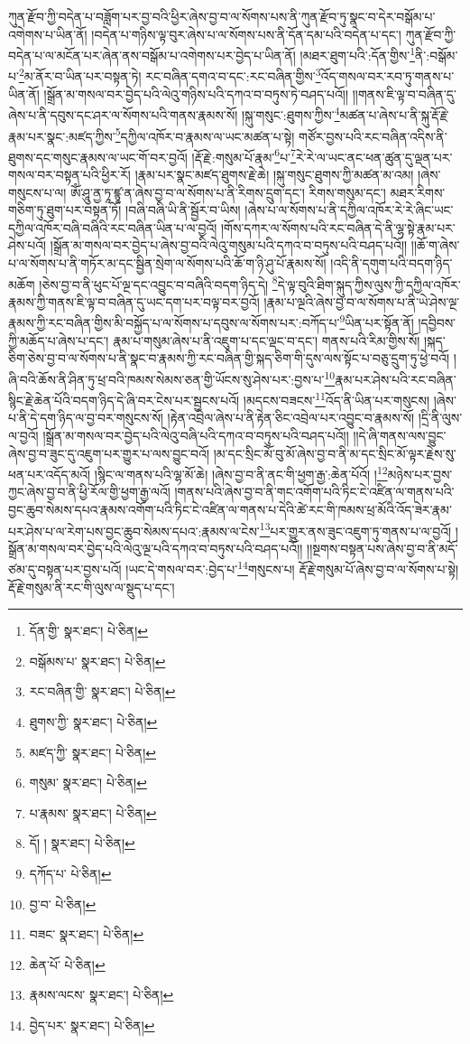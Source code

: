 ཀུན་རྫོབ་ཀྱི་བདེན་པ་བཟློག་པར་བྱ་བའི་ཕྱིར་ཞེས་བྱ་བ་ལ་སོགས་པས་ནི་ཀུན་རྫོབ་ཏུ་སྣང་བ་དེར་བསྒོམ་པ་འགེགས་པ་ཡིན་ནོ། །བདེན་པ་གཉིས་ལྟ་བུར་ཞེས་པ་ལ་སོགས་པས་ནི་དོན་དམ་པའི་བདེན་པ་དང་། ཀུན་རྫོབ་ཀྱི་བདེན་པ་ལ་མངོན་པར་ཞེན་ནས་བསྒོམ་པ་འགེགས་པར་བྱེད་པ་ཡིན་ནོ། །མཐར་ཐུག་པའི་:དོན་གྱིས་\footnote{དོན་གྱི་  སྣར་ཐང་།  པེ་ཅིན། }ནི་:བསྒོམ་པ་\footnote{བསྒོམས་པ་  སྣར་ཐང་།  པེ་ཅིན། }མ་ནོར་བ་ཡིན་པར་བསྟན་ཏེ། རང་བཞིན་དགའ་བ་དང་:རང་བཞིན་གྱིས་\footnote{རང་བཞིན་གྱི་  སྣར་ཐང་།  པེ་ཅིན། }འོད་གསལ་བར་རབ་ཏུ་གནས་པ་ཡིན་ནོ། །སྒྲོན་མ་གསལ་བར་བྱེད་པའི་ལེའུ་གཉིས་པའི་དཀའ་བ་བཏུས་ཏེ་བཤད་པའོ།། །།གནས་ཇི་ལྟ་བ་བཞིན་དུ་ཞེས་པ་ནི་དབུས་དང་ཤར་ལ་སོགས་པའི་གནས་རྣམས་སོ། །སྐུ་གསུང་:ཐུགས་ཀྱིས་\footnote{ཐུགས་ཀྱི་  སྣར་ཐང་།  པེ་ཅིན། }མཚན་པ་ཞེས་པ་ནི་སྐུ་རྡོ་རྗེ་རྣམ་པར་སྣང་:མཛད་ཀྱིས་\footnote{མཛད་ཀྱི་  སྣར་ཐང་།  པེ་ཅིན། }དཀྱིལ་འཁོར་བ་རྣམས་ལ་ཡང་མཚན་པ་སྟེ། གཙོར་བྱས་པའི་རང་བཞིན་འདིས་ནི་ཐུགས་དང་གསུང་རྣམས་ལ་ཡང་གོ་བར་བྱའོ། །རྡོ་རྗེ་:གསུམ་པོ་རྣམ་\footnote{གསུམ་  སྣར་ཐང་།  པེ་ཅིན། }པ་\footnote{པ་རྣམས་  སྣར་ཐང་།  པེ་ཅིན། }རེ་རེ་ལ་ཡང་ནང་ཕན་ཚུན་དུ་ལྡན་པར་གསལ་བར་བསྟན་པའི་ཕྱིར་རོ། །རྣམ་པར་སྣང་མཛད་ཐུགས་རྗེ་ཆེ། །སྐུ་གསུང་ཐུགས་ཀྱི་མཚན་མ་འམ། །ཞེས་གསུངས་པ་ལ། ཨོཾ་ཤཱུ་ནྱ་ཏཱ་ཛྙཱ་ན་ཞེས་བྱ་བ་ལ་སོགས་པ་ནི་རིགས་དྲུག་དང་། རིགས་གསུམ་དང་། མཐར་རིགས་གཅིག་ཏུ་ཐུག་པར་བསྟན་ཏོ། །བཞི་བཞི་ཡི་ནི་སྦྱོར་བ་ཡིས། །ཞེས་པ་ལ་སོགས་པ་ནི་དཀྱིལ་འཁོར་རེ་རེ་ཞིང་ཡང་དཀྱིལ་འཁོར་བཞི་བཞིའི་རང་བཞིན་ཡིན་པ་ལ་བྱའོ། །གོས་དཀར་ལ་སོགས་པའི་རང་བཞིན་དེ་ནི་ལྷ་སྟེ་རྣམ་པར་ཤེས་པའོ། །སྒྲོན་མ་གསལ་བར་བྱེད་པ་ཞེས་བྱ་བའི་ལེའུ་གསུམ་པའི་དཀའ་བ་བཏུས་པའི་བཤད་པའོ།། །།ཆོ་ག་ཞེས་པ་ལ་སོགས་པ་ནི་གཏོར་མ་དང་སྦྱིན་སྲེག་ལ་སོགས་པའི་ཆོ་ག་ཉི་ཤུ་པོ་རྣམས་སོ། །འདི་ནི་དགུག་པའི་བདག་ཉིད་མཆོག །ཅེས་བྱ་བ་ནི་ཕུང་པོ་ལྔ་དང་འབྱུང་བ་བཞིའི་བདག་ཉིད་དེ། \footnote{དོ། །   སྣར་ཐང་།  པེ་ཅིན། }དེ་ལྟ་བུའི་ཐིག་སྐུད་ཀྱིས་ལུས་ཀྱི་དཀྱིལ་འཁོར་རྣམས་ཀྱི་གནས་ཇི་ལྟ་བ་བཞིན་དུ་ཡང་དག་པར་བལྟ་བར་བྱའོ། །རྣམ་པ་ལྔའི་ཞེས་བྱ་བ་ལ་སོགས་པ་ནི་ཡེ་ཤེས་ལྔ་རྣམས་ཀྱི་རང་བཞིན་གྱིས་མི་བསྐྱོད་པ་ལ་སོགས་པ་དབུས་ལ་སོགས་པར་:བཀོད་པ་\footnote{དཀོད་པ་  པེ་ཅིན། }ཡིན་པར་སྟོན་ནོ། །དབྱིབས་ཀྱི་མཆོད་པ་ཞེས་པ་དང་། རྣམ་པ་གསུམ་ཞེས་པ་ནི་འཇུག་པ་དང་ལྡང་བ་དང་། གནས་པའི་རིམ་གྱིས་སོ། །སྐད་ཅིག་ཅེས་བྱ་བ་ལ་སོགས་པ་ནི་སྣང་བ་རྣམས་ཀྱི་རང་བཞིན་གྱི་སྐད་ཅིག་གི་དུས་ལས་སྟོང་པ་བཅུ་དྲུག་ཏུ་ཕྱེ་བའོ། །ཞི་བའི་ཆོས་ནི་ཤིན་ཏུ་ཕྲ་བའི་ཁམས་སེམས་ཅན་གྱི་ཡོངས་སུ་ཤེས་པར་:བྱས་པ་\footnote{བྱ་བ་  པེ་ཅིན། }རྣམ་པར་ཤེས་པའི་རང་བཞིན་སྙིང་རྗེ་ཆེན་པོའི་བདག་ཉིད་དེ་ཞི་བར་ངེས་པར་སྦྱངས་པའོ། །མདངས་བཟངས་\footnote{བཟང་  སྣར་ཐང་།  པེ་ཅིན། }འོད་ནི་ཡིན་པར་གསུངས། །ཞེས་པ་ནི་དེ་དག་ཉིད་ལ་བྱ་བར་གསུངས་སོ། །རྟེན་འབྲེལ་ཞེས་པ་ནི་རྟེན་ཅིང་འབྲེལ་པར་འབྱུང་བ་རྣམས་སོ། །དྲི་ནི་ལུས་ལ་བྱའོ། །སྒྲོན་མ་གསལ་བར་བྱེད་པའི་ལེའུ་བཞི་པའི་དཀའ་བ་བཏུས་པའི་བཤད་པའོ།། །།དེ་ཞི་གནས་ལས་བྱུང་ཞེས་བྱ་བ་ཟུང་དུ་འཇུག་པར་གྱུར་པ་ལས་བྱུང་བའོ། །མ་དང་སྲིང་མོ་བུ་མོ་ཞེས་བྱ་བ་ནི་མ་དང་སྲིང་མོ་ལྟར་རྗེས་སུ་ཕན་པར་འདོད་མའོ། །སྙིང་ལ་གནས་པའི་ལྷ་མོ་ཆེ། །ཞེས་བྱ་བ་ནི་ནང་གི་ཕྱག་རྒྱ་:ཆེན་པོའོ། །\footnote{ཆེན་པོ་  པེ་ཅིན། }མཉེས་པར་བྱས་ཀྱང་ཞེས་བྱ་བ་ནི་ཕྱི་རོལ་གྱི་ཕྱག་རྒྱ་ལའོ། །གནས་པའི་ཞེས་བྱ་བ་ནི་གང་འགོག་པའི་ཏིང་ངེ་འཛིན་ལ་གནས་པའི་བྱང་ཆུབ་སེམས་དཔའ་རྣམས་འགོག་པའི་ཏིང་ངེ་འཛིན་ལ་གནས་པ་དེའི་ཚེ་རང་གི་ཁམས་ཕྲ་མོའི་འོད་ཟེར་རྣམ་པར་ཤེས་པ་ལ་རེག་པས་བྱང་ཆུབ་སེམས་དཔའ་:རྣམས་ལ་ངེས་\footnote{རྣམས་ལངས་  སྣར་ཐང་།  པེ་ཅིན། }པར་གྱུར་ནས་ཟུང་འཇུག་ཏུ་གནས་པ་ལ་བྱའོ། །སྒྲོན་མ་གསལ་བར་བྱེད་པའི་ལེའུ་ལྔ་པའི་དཀའ་བ་བཏུས་པའི་བཤད་པའོ།། །།སྔགས་བསྟན་པས་ཞེས་བྱ་བ་ནི་མདོ་ཙམ་དུ་བསྟན་པར་བྱས་པའོ། །ཡང་དེ་གསལ་བར་:བྱེད་པ་\footnote{བྱེད་པར་  སྣར་ཐང་།  པེ་ཅིན། }གསུངས་པ། རྡོ་རྗེ་གསུམ་པོ་ཞེས་བྱ་བ་ལ་སོགས་པ་སྟེ། རྡོ་རྗེ་གསུམ་ནི་རང་གི་ལུས་ལ་སྡུད་པ་དང་། 